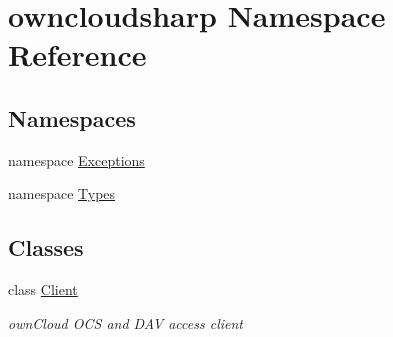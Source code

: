 \hypertarget{namespaceowncloudsharp}{}\section{owncloudsharp Namespace Reference}
\label{namespaceowncloudsharp}
\subsection*{Namespaces}
\begin{DoxyCompactItemize}
\item 
namespace \hyperlink{namespaceowncloudsharp_1_1_exceptions}{Exceptions}
\item 
namespace \hyperlink{namespaceowncloudsharp_1_1_types}{Types}
\end{DoxyCompactItemize}
\subsection*{Classes}
\begin{DoxyCompactItemize}
\item 
class \hyperlink{classowncloudsharp_1_1_client}{Client}
\begin{DoxyCompactList}\small\item\em own\+Cloud O\+C\+S and D\+A\+V access client \end{DoxyCompactList}\end{DoxyCompactItemize}
